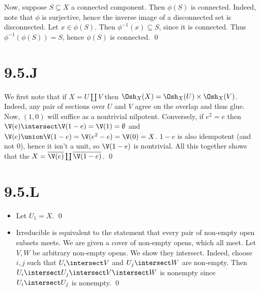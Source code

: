 \documentclass{article}
\begin{document}
Now, suppose $S \subseteq X$ a connected component. Then
$\phi(S)$ is connected. Indeed, note that $\phi$
is surjective, hence the inverse image of a disconnected set is disconnected.
Let $x \in \phi(S)$. Then $\phi^{-1}(x) \subseteq S$, since it is
connected. Thus $\phi^{-1}(\phi(S)) = S$, hence $\phi(S)$ is
connected. \qed

\section{9.5.J}
We first note that if $X=U \coprod V$ then $\Osh_X(X)=\Osh_X(U) \times \Osh_X(V)$.
Indeed, any pair of sections over $U$ and
$V$ agree on the overlap and thus glue. Now,
$(1,0)$ will suffice as a nontrivial nilpotent. Conversely, if
$e^2=e$ then $\V(e) \intersect \V(1-e)
	=\V(1)= \emptyset$ and
$\V(e) \union
	\V(1-e)=\V(e^2-e)=\V(0)=X$. $1-e$ is also idempotent (and not
0), hence it isn't a unit, so $\V(1-e)$ is nontrivial. All this
together shows that the $X=\overline{\V(e)} \coprod \overline{\V(1-e)}$. \qed

\section{9.5.L}
\begin{itemize}
	\item[$\implies$] Let $U_1=X$. \qed
	\item[$\impliedby$] Irreducible is equivalent to the statement that every
	      pair of non-empty open subsets meets. We are given a cover of non-empty opens,
	      which all meet. Let $V, W$ be arbitrary non-empty opens. We
	      show they intersect. Indeed, choose $i, j$ such that
	      $U_i \intersect V$ and $U_j \intersect W$ are non-empty. Then
	      $U_i \intersect U_j \intersect V \intersect W$ is nonempty since $U_i \intersect U_j$ is nonempty.
	      \qed
\end{itemize}
\end{document}
